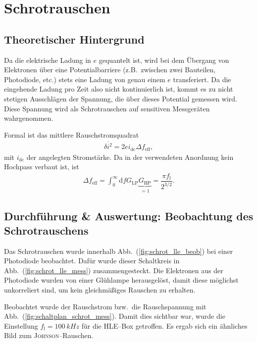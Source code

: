 \documentclass[sn-mathphys-num,iicol]{sn-jnl}
\theoremstyle{thmstyleone}
\theoremstyle{thmstyletwo}
\theoremstyle{thmstylethree}
\newcommand{\td}{\text{d}}
\begin{document}
\section{Schrotrauschen}
\subsection{Theoretischer Hintergrund}
Da die elektrische Ladung in $e$ gequantelt ist, wird bei dem Übergang von Elektronen über eine Potentialbarriere (z.B.\ zwischen zwei Bauteilen, Photodiode, etc.) stets eine Ladung von genau einem $e$ transferiert.
Da die eingehende Ladung pro Zeit also nicht kontinuierlich ist, kommt es zu nicht stetigen Ausschlägen der Spannung, die über dieses Potential gemessen wird.
Diese Spannung wird als Schrotrauschen auf sensitiven Messgeräten wahrgenommen.

Formal ist das mittlere Rauschstromquadrat
\begin{align}
	\overline{\delta i^2}=2ei_\text{dc}\Delta f_\text{eff}
	,\end{align}
mit $i_\text{dc}$ der angelegten Stromstärke.
Da in der verwendeten Anordnung kein Hochpass verbaut ist, ist 
\begin{align} 
  \Delta f_\text{eff}=\int_{0}^{\infty}\td fG_\text{LP}\underbrace{G_\text{HP}}_{=1}=\dfrac{\pi f_\text{l}}{2^{3/2}}
.\end{align}

\subsection{Durchführung \& Auswertung: Beobachtung des Schrotrauschens}
Das Schrotrauschen wurde innerhalb Abb.\ (\ref{fig:schrot_lle_beob}) bei einer Photodiode beobachtet.
Dafür wurde dieser Schaltkreis in Abb.\ (\ref{fig:schrot_lle_mess}) zusammengesteckt.
Die Elektronen aus der Photodiode wurden von einer Glühlampe herausgelöst, damit diese möglichst unkorreliert sind, um kein gleichmäßiges Rauschen zu erhalten.

Beobachtet wurde der Rauschstrom bzw.\ die Rauschspannung mit Abb.\ (\ref{fig:schaltplan_schrot_mess}).
Damit dies sichtbar war, wurde die Einstellung $f_\text{l}=\SI{100}{kHz}$ für die HLE--Box getroffen.
Es ergab sich ein ähnliches Bild zum \textsc{Johnson}--Rauschen. %
\end{document}
